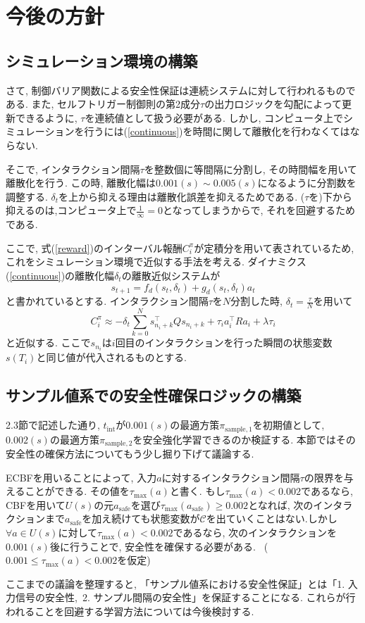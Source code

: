 \documentclass{jsarticle}
\begin{document}
\section{今後の方針}
\subsection{シミュレーション環境の構築}
さて, 制御バリア関数による安全性保証は連続システムに対して行われるものである. また, セルフトリガー制御則の第2成分$\tau$の出力ロジックを勾配によって更新できるように, $\tau$を連続値として扱う必要がある. しかし, コンピュータ上でシミュレーションを行うには(\ref{continuous})を時間に関して離散化を行わなくてはならない.\par
そこで, インタラクション間隔$\tau$を整数個に等間隔に分割し, その時間幅を用いて離散化を行う. この時, 離散化幅は$0.001(s)\sim 0.005(s)$になるように分割数を調整する. $\delta_t$を上から抑える理由は離散化誤差を抑えるためである. ($\tau$を)下から抑えるのは,コンピュータ上で$\frac{1}{\infty}=0$となってしまうからで, それを回避するためである.\par
ここで, 式(\ref{reward})のインターバル報酬$C^{\pi}_i$が定積分を用いて表されているため, これをシミュレーション環境で近似する手法を考える. ダイナミクス(\ref{continuous})の離散化幅$\delta_t$の離散近似システムが
\begin{equation}
	s_{t+1} = f_d(s_t, \delta_t) + g_d(s_t, \delta_t)a_t
\end{equation}
と書かれているとする. インタラクション間隔$\tau$を$N$分割した時, $\delta_t = \frac{\tau}{N}$を用いて
\begin{equation}
	C^{\pi}_i \approx -\delta_t\sum_{k=0}^{N}s_{n_i+k}^{\top}Qs_{n_i+k}+\tau_ia_i^{\top}Ra_i + \lambda \tau_i
\end{equation}
と近似する. ここで$s_{n_i}$は$i$回目のインタラクションを行った瞬間の状態変数$s(T_i)$と同じ値が代入されるものとする.\par

\subsection{サンプル値系での安全性確保ロジックの構築}
2.3節で記述した通り, $t_{\textrm{int}}$が$0.001(s)$の最適方策$\pi_{\textrm{sample},1}$を初期値として,~$0.002(s)$の最適方策$\pi_{\textrm{sample},2}$を安全強化学習できるのか検証する. 本節ではその安全性の確保方法についてもう少し掘り下げて議論する.\par
ECBFを用いることによって, 入力$a$に対するインタラクション間隔$\tau$の限界を与えることができる. その値を$\tau_{\textrm{max}}(a)$と書く. もし$\tau_{\textrm{max}}(a)<0.002$であるなら, CBFを用いて$U(s)$の元$a_{\textrm{safe}}$を選び$\tau_{\textrm{max}}(a_{\textrm{safe}})\geq0.002$となれば, 次のインタラクションまで$a_{\textrm{safe}}$を加え続けても状態変数が$\mathcal{C}$を出ていくことはない.しかし$\forall a \in U(s)$に対して$\tau_{\textrm{max}}(a)<0.002$であるなら, 次のインタラクションを$0.001(s)$後に行うことで, 安全性を確保する必要がある. ~($0.001\leq\tau_{\textrm{max}}(a)<0.002$を仮定)\par
ここまでの議論を整理すると, 「サンプル値系における安全性保証」とは「1. 入力信号の安全性,~2. サンプル間隔の安全性」を保証することになる. これらが行われることを回避する学習方法については今後検討する.
\end{document}
